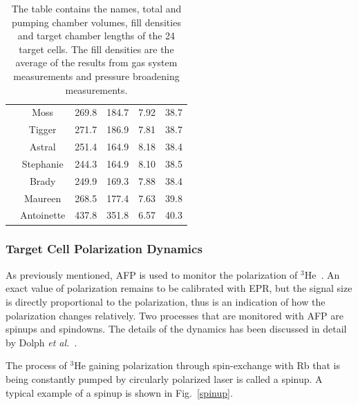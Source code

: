 \begin{table}
\begin{center}
\begin{tabular}{|c|c|c|c|c|c|}
			& Moss & 269.8 & 184.7 & 7.92 & 38.7\\ \cline{2-6}
			& Tigger & 271.7 & 186.9 & 7.81 & 38.7\\ \cline{2-6}
			& Astral & 251.4 & 164.9 & 8.18 & 38.4\\ \cline{2-6}
			& Stephanie & 244.3 & 164.9 & 8.10 & 38.5\\ \cline{2-6}
			& Brady & 249.9 & 169.3 & 7.88 & 38.4\\ \cline{2-6}
			& Maureen & 268.5 & 177.4 & 7.63 & 39.8\\ \cline{2-6}
			& Antoinette & 437.8 & 351.8 & 6.57 & 40.3\\ \hline
		\end{tabular}
	\end{center}
	\caption{The table contains the names, total and pumping chamber volumes, fill densities and target chamber lengths of the 24 target cells. The fill densities are the average of the results from gas system measurements and pressure broadening measurements.}
	\label{fill_densities}
\end{table}

\subsubsection{Target Cell Polarization Dynamics}

As previously mentioned, AFP is used to monitor the polarization of $^{3}$He~\cite{Abragam}. An exact value of polarization remains to be calibrated with EPR, but the signal size is directly proportional to the polarization, thus is an indication of how the polarization changes relatively. Two processes that are monitored with AFP are spinups and spindowns. The details of the dynamics has been discussed in detail by Dolph \emph{et al.}~\cite{PhysRevC.84.065201}.

The process of $^{3}$He gaining polarization through spin-exchange with Rb that is being constantly pumped by circularly polarized laser is called a spinup. A typical example of a spinup is shown in Fig.~\ref{spinup}.

